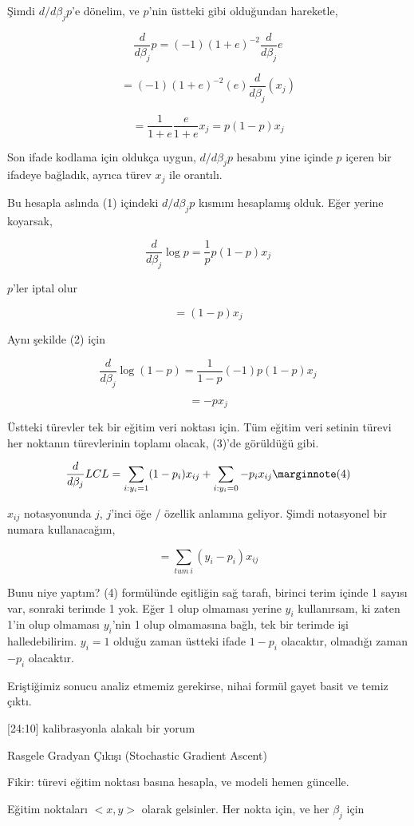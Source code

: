 \documentclass[12pt,fleqn]{article}\usepackage{../../common}
\begin{document}
Şimdi  $d/d\beta_j p$'e dönelim, ve $p$'nin üstteki gibi olduğundan
hareketle,

$$ \frac{ d}{d\beta_j}p = (-1)(1+e)^{-2} \frac{ d}{d\beta_j}e $$

$$ = (-1)(1+e)^{-2} (e) \frac{ d}{d\beta_j}(x_j) $$

$$ = \frac{ 1}{1+e} \frac{ e}{1+e}x_j = p(1-p)x_j$$

Son ifade kodlama için oldukça uygun, $d/d\beta_j p$ hesabını yine içinde
$p$ içeren bir ifadeye bağladık, ayrıca türev $x_j$ ile orantılı. 

Bu hesapla aslında (1) içindeki $d/d\beta_j p$ kısmını hesaplamış
olduk. Eğer yerine koyarsak, 

$$ 
\frac{d}{d\beta_j}\log p = \frac{1}{p}p(1-p)x_j 
$$

$p$'ler iptal olur

$$ 
= (1-p)x_j 
$$

Aynı şekilde (2) için 

$$ 
\frac{d}{d\beta_j}\log (1-p) = \frac{1}{1-p}(-1) p(1-p)x_j 
$$

$$ 
 =  -px_j 
$$

Üstteki türevler tek bir eğitim veri noktası için. Tüm eğitim veri setinin
türevi her noktanın türevlerinin toplamı olacak, (3)'de görüldüğü gibi.

$$ \frac{d}{d\beta_j} LCL = 
\sum _{i: y_i = 1} (1-p_i)x_{ij} + 
\sum _{i: y_i = 0} -p_i x_{ij}  
\mlabel{4}
$$

$x_{ij}$ notasyonunda $j$, $j$'inci öğe / özellik anlamına geliyor. Şimdi 
notasyonel bir numara kullanacağım, 

$$ = \sum _{tum \ i} (y_i - p_i)x_{ij} $$

Bunu niye yaptım? (4) formülünde eşitliğin sağ tarafı, birinci terim içinde
1 sayısı var, sonraki terimde 1 yok. Eğer 1 olup olmaması yerine $y_i$
kullanırsam, ki zaten 1'in olup olmaması $y_i$'nin 1 olup olmamasına bağlı,
tek bir terimde işi halledebilirim. $y_i=1$ olduğu zaman üstteki ifade
$1-p_i$ olacaktır, olmadığı zaman $-p_i$ olacaktır. 

Eriştiğimiz sonucu analiz etmemiz gerekirse, nihai formül gayet basit ve
temiz çıktı. 

[24:10] kalibrasyonla alakalı bir yorum

Rasgele Gradyan Çıkışı (Stochastic Gradient Ascent)

Fikir: türevi eğitim noktası basına hesapla, ve modeli hemen güncelle. 

Eğitim noktaları $< x,y >$ olarak gelsinler. Her nokta için, ve her $\beta_j$
için
\end{document}

